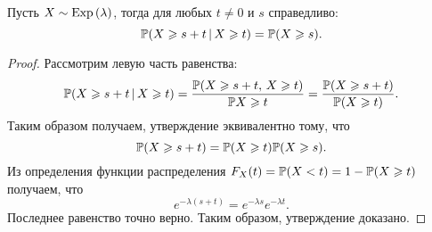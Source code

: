 \begin{assertion}
        Пусть $X\sim\mbox{Exp\,}(\lambda)$, тогда для любых $t \neq 0$ и $s$ справедливо:
$$
        \mathbb{P}(X\geqslant s+t\,|\,X\geqslant t) =
        \mathbb{P}(X \geqslant s).
$$
\end{assertion}

\begin{proof}
        Рассмотрим левую часть равенства:
$$
        \mathbb{P}(X \geqslant s + t\,|\,X\geqslant t) =
        \frac{\mathbb{P}(X \geqslant s + t,\,X\geqslant t)}{\mathbb{P}{X\geqslant t}} =
        \frac{\mathbb{P}(X \geqslant s + t)}{\mathbb{P}(X\geqslant t)}.
$$
Таким образом получаем, утверждение эквивалентно тому, что
$$
        \mathbb{P}(X\geqslant s+t) = 
        \mathbb{P}(X\geqslant t)\mathbb{P}(X\geqslant s).
$$
Из определения функции распределения $F_X(t) = \mathbb{P}(X < t) = 1 - \mathbb{P}(X \geqslant t)$ получаем, что
$$
        e^{-\lambda(s+t)} = e^{-\lambda s}e^{-\lambda t}.
$$
Последнее равенство точно верно. Таким образом, утверждение доказано.
\end{proof}